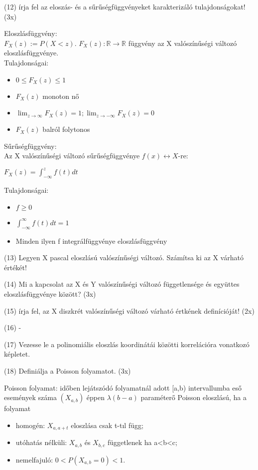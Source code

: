 \documentclass[12p]{article}
\begin{document}
(12) írja fel az eloszás- és a sűrűségfüggvényeket karakterizáló tulajdonságokat! (3x)

Eloszlásfüggvény:\\
$F_X(z):=P(X<z)$. $F_X(z):\mathbb{R}\rightarrow\mathbb{R}$ függvény az X valószínűségi változó eloszlásfüggvénye.\\
Tulajdonságai:

\begin{itemize}
	\item $0 \leq F_X(z) \leq 1$
	\item $F_X(z)$ monoton nő
	\item $\lim_{z \rightarrow \infty} F_X(z) = 1; \lim_{z \rightarrow -\infty} F_X(z) = 0$
	\item $F_X(z)$ balról folytonos
\end{itemize}

Sűrűségfüggvény:\\
Az X valószínűségi változó sűrűségfüggvénye $f(x) \leftrightarrow X$-re:

$F_X(z) = \int_{-\infty}^z f(t) dt$

Tulajdonságai:
\begin{itemize}
	\item $f \geq 0$
	\item $\int_{-\infty}^{\infty} f(t) dt = 1$
	\item Minden ilyen f integrálfüggvénye eloszlásfüggvény
\end{itemize}

(13) Legyen X pascal eloszlású valószínűségi változó. Számítsa ki az X várható értékét!

(14) Mi a kapcsolat az X és Y valószínűségi változó függetlensége és együttes eloszlásfüggvénye között? (3x)

(15) írja fel, az X diszkrét valószínűségi változó várható értkének definícióját! (2x)

(16) -

(17) Vezesse le a polinomiális eloszlás koordinátái közötti korrelációra vonatkozó képletet.

(18) Definiálja a Poisson folyamatot. (3x)

Poisson folyamat: időben lejátszódó folyamatnál adott [a,b) intervallumba eső események száma $(X_{a,b})$ éppen $\lambda(b-a)$ paraméterő Poisson eloszlású, ha a folyamat

\begin{itemize}
	\item homogén: $X_{a,a+t}$ eloszlása csak t-tıl függ;
	\item utóhatás nélküli: $X_{a,b}$ és $X_{b,c}$ függetlenek ha a<b<c;
	\item nemelfajuló: $0<P (X_{a,b}=0)<1$.

\end{itemize}
\end{document}
